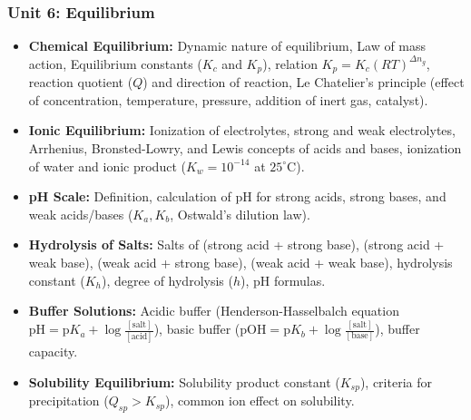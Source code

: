 \documentclass[11pt,a4paper]{article}
\begin{document}
\subsubsection{Unit 6: Equilibrium}
\begin{itemize}
  \item \textbf{Chemical Equilibrium:} Dynamic nature of equilibrium, Law of mass action, Equilibrium constants ($K_c$ and $K_p$), relation $K_p = K_c(RT)^{\Delta n_g}$, reaction quotient ($Q$) and direction of reaction, Le Chatelier's principle (effect of concentration, temperature, pressure, addition of inert gas, catalyst).
  \item \textbf{Ionic Equilibrium:} Ionization of electrolytes, strong and weak electrolytes, Arrhenius, Bronsted-Lowry, and Lewis concepts of acids and bases, ionization of water and ionic product ($K_w = 10^{-14}$ at $25^\circ\text{C}$).
  \item \textbf{pH Scale:} Definition, calculation of pH for strong acids, strong bases, and weak acids/bases ($K_a, K_b$, Ostwald's dilution law).
  \item \textbf{Hydrolysis of Salts:} Salts of (strong acid + strong base), (strong acid + weak base), (weak acid + strong base), (weak acid + weak base), hydrolysis constant ($K_h$), degree of hydrolysis ($h$), pH formulas.
  \item \textbf{Buffer Solutions:} Acidic buffer (Henderson-Hasselbalch equation $\text{pH} = \text{p}K_a + \log\frac{[\text{salt}]}{[\text{acid}]}$), basic buffer ($\text{pOH} = \text{p}K_b + \log\frac{[\text{salt}]}{[\text{base}]}$), buffer capacity.
  \item \textbf{Solubility Equilibrium:} Solubility product constant ($K_{sp}$), criteria for precipitation ($Q_{sp} > K_{sp}$), common ion effect on solubility.
\end{itemize}
\end{document}
